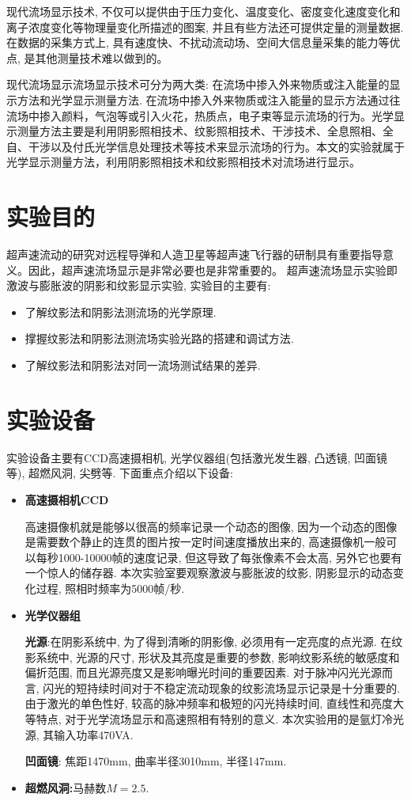 \documentclass[12pt,a4paper,boxed,titlepage]{caspset}
\begin{document}
现代流场显示技术, 不仅可以提供由于压力变化、温度变化、密度变化速度变化和离子浓度变化等物理量变化所描述的图案, 并且有些方法还可提供定量的测量数据. 在数据的采集方式上, 具有速度快、不扰动流动场、空间大信息量采集的能力等优点, 是其他测量技术难以做到的。

现代流场显示流场显示技术可分为两大类: 在流场中掺入外来物质或注入能量的显示方法和光学显示测量方法. 在流场中掺入外来物质或注入能量的显示方法通过往流场中掺入颜料，气泡等或引入火花，热质点，电子束等显示流场的行为。光学显示测量方法主要是利用阴影照相技术、纹影照相技术、干涉技术、全息照相、全自、干涉以及付氏光学信息处理技术等技术来显示流场的行为。本文的实验就属于光学显示测量方法，利用阴影照相技术和纹影照相技术对流场进行显示。

\section{实验目的}
超声速流动的研究对远程导弹和人造卫星等超声速飞行器的研制具有重要指导意义。因此，超声速流场显示是非常必要也是非常重要的。
超声速流场显示实验即激波与膨胀波的阴影和纹影显示实验, 实验目的主要有:
\begin{itemize}
\item 了解纹影法和阴影法测流场的光学原理.
\item 撑握纹影法和阴影法测流场实验光路的搭建和调试方法.
\item 了解纹影法和阴影法对同一流场测试结果的差异.
\end{itemize}

\section{实验设备}

实验设备主要有CCD高速摄相机, 光学仪器组(包括激光发生器, 凸透镜, 凹面镜等), 超燃风洞, 尖劈等. 下面重点介绍以下设备:
\begin{itemize}
\item \textbf{高速摄相机CCD}

高速摄像机就是能够以很高的频率记录一个动态的图像, 因为一个动态的图像是需要数个静止的连贯的图片按一定时间速度播放出来的, 高速摄像机一般可以每秒1000-10000帧的速度记录, 但这导致了每张像素不会太高, 另外它也要有一个惊人的储存器.
本次实验室要观察激波与膨胀波的纹影, 阴影显示的动态变化过程, 照相时频率为5000帧/秒.

\item \textbf{光学仪器组}

\textbf{光源}:在阴影系统中, 为了得到清晰的阴影像, 必须用有一定亮度的点光源. 在纹影系统中, 光源的尺寸, 形状及其亮度是重要的参数, 影响纹影系统的敏感度和偏折范围, 而且光源亮度又是影响曝光时间的重要因素. 对于脉冲闪光光源而言, 闪光的短持续时间对于不稳定流动现象的纹影流场显示记录是十分重要的. 由于激光的单色性好, 较高的脉冲频率和极短的闪光持续时间, 直线性和亮度大等特点, 对于光学流场显示和高速照相有特别的意义. 本次实验用的是氩灯冷光源, 其输入功率470VA.

\textbf{凹面镜}: 焦距1470mm, 曲率半径3010mm, 半径147mm.

\item \textbf{超燃风洞:}马赫数$M=2.5$.
\end{itemize}
\end{document}
